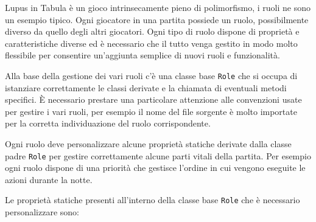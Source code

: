 Lupus in Tabula è un gioco intrinsecamente pieno di polimorfismo, i ruoli ne sono un esempio tipico. Ogni giocatore in una partita possiede un ruolo, possibilmente diverso da quello degli altri giocatori. Ogni tipo di ruolo dispone di proprietà e caratteristiche diverse ed è necessario che il tutto venga gestito in modo molto flessibile per consentire un'aggiunta semplice di nuovi ruoli e funzionalità. 

Alla base della gestione dei vari ruoli c'è una classe base \texttt{Role} che si occupa di istanziare correttamente le classi derivate e la chiamata di eventuali metodi specifici. È necessario prestare una particolare attenzione alle convenzioni usate per gestire i vari ruoli, per esempio il nome del file sorgente è molto importate per la corretta individuazione del ruolo corrispondente.

Ogni ruolo deve personalizzare alcune proprietà statiche derivate dalla classe padre \texttt{Role} per gestire correttamente alcune parti vitali della partita. Per esempio ogni ruolo dispone di una priorità che gestisce l'ordine in cui vengono eseguite le azioni durante la notte.

Le proprietà statiche presenti all'interno della classe base \texttt{Role} che è necessario personalizzare sono:

